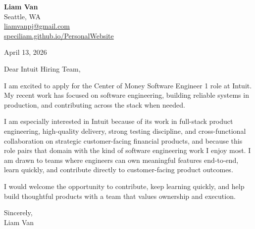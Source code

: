 \documentclass[letterpaper,11pt]{article}
\begin{document}
\begin{flushleft}
\textbf{\Large Liam Van} \\
Seattle, WA \\
\href{mailto:liamvanpj@gmail.com}{liamvanpj@gmail.com} \\
\href{https://speciliam.github.io/PersonalWebsite}{speciliam.github.io/PersonalWebsite}
\end{flushleft}

April 13, 2026

\noindent Dear Intuit Hiring Team,

\noindent I am excited to apply for the Center of Money Software Engineer 1 role at Intuit. My recent work has focused on software engineering, building reliable systems in production, and contributing across the stack when needed.

\noindent I am especially interested in Intuit because of its work in full-stack product engineering, high-quality delivery, strong testing discipline, and cross-functional collaboration on strategic customer-facing financial products, and because this role pairs that domain with the kind of software engineering work I enjoy most. I am drawn to teams where engineers can own meaningful features end-to-end, learn quickly, and contribute directly to customer-facing product outcomes.

\noindent I would welcome the opportunity to contribute, keep learning quickly, and help build thoughtful products with a team that values ownership and execution.

\noindent Sincerely, \\
Liam Van
\end{document}
